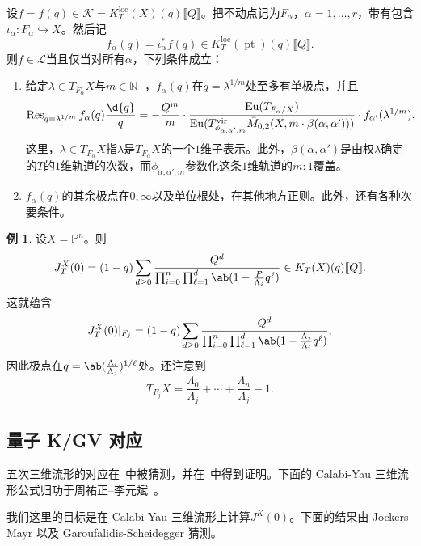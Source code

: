 \documentclass{amsart}
\theoremstyle{definition}
\newtheorem{exm}[thm]{例}
\theoremstyle{remark}
\theoremstyle{plain}
\theoremstyle{definition}
\theoremstyle{remark}
\newcommand{\N}{\mathbb{N}}
\renewcommand{\P}{\mathbb{P}}
\newcommand{\mc}[1]{\mathcal{#1}}
\newcommand{\mr}[1]{\mathrm{#1}}
\newcommand{\on}[1]{\operatorname{#1}}
\newcommand{\1}{\mathbf{1}}
\newcommand{\2}{\mathbf{2}}
\newcommand{\3}{\mathbf{3}}
\newcommand{\vir}{\mr{vir}}
\newcommand{\ps}[1]{\llbracket #1 \rrbracket}
\newcommand{\loc}{\mr{loc}}
\begin{document}
设\(f = f(q) \in \mc{K} = K_T^{\loc}(X)(q)\ps{Q}\)。把不动点记为\(F_{\alpha}\)，\(\alpha = 1, \ldots, r\)，带有包含\(\iota_{\alpha} \colon F_{\alpha} \hookrightarrow X\)。然后记
\[ f_{\alpha}(q) = \iota_{\alpha}^* f(q) \in K_T^{\loc}(\on{pt})(q)\ps{Q}. \]
则\(f \in \mc{L}\)当且仅当对所有\(\alpha\)，下列条件成立：
\begin{enumerate}
    \item 给定\(\lambda \in T_{F_{\alpha}} X\)与\(m \in \N_+\)，\(f_{\alpha}(q)\)在\(q = \lambda^{1/m}\)处至多有单极点，并且
        \[ \on{Res}_{q = \lambda^{1/m}} f_{\alpha}(q) \frac{\d{q}}{q} = -\frac{Q^m}{m} \cdot \frac{\on{Eu}(T_{F_{\alpha}/X})}{\on{Eu}(T^{\vir}_{\phi_{\alpha,\alpha',m}}\bar{M}_{0,2}(X, m \cdot \beta(\alpha, \alpha')))} \cdot f_{\alpha'}(\lambda^{1/m}). \]
        这里，\(\lambda \in T_{F_{\alpha}}X\)指\(\lambda\)是\(T_{F_{\alpha}} X\)的一个\(1\)维子表示。此外，\(\beta(\alpha,\alpha')\)是由权\(\lambda\)确定的\(T\)的\(1\)维轨道的次数，而\(\phi_{\alpha, \alpha', m}\)参数化这条\(1\)维轨道的\(m:1\)覆盖。
    \item \(f_{\alpha}(q)\)的其余极点在\(0, \infty\)以及单位根处，在其他地方正则。此外，还有各种次要条件。
\end{enumerate}

\begin{exm}
    设\(X = \P^n\)。则
    \[ J_T^X(0) = (1-q) \sum_{d \geq 0} \frac{Q^d}{\prod_{i=0}^n \prod_{\ell = 1}^d \ab(1 - \frac{P}{\Lambda_i} q^{\ell})} \in K_T(X)(q) \ps{Q}. \]
    这就蕴含
    \[ J_T^X(0) |_{F_j} = (1-q) \sum_{d \geq 0} \frac{Q^d}{\prod_{i=0}^n \prod_{\ell = 1}^d \ab(1 - \frac{\Lambda_j}{\Lambda_i}q^{\ell})}, \]
    因此极点在\(q = \ab(\frac{\Lambda_i}{\Lambda_j})^{1/\ell}\)处。还注意到
    \[ T_{F_j} X = \frac{\Lambda_0}{\Lambda_j} + \cdots + \frac{\Lambda_n}{\Lambda_j} - 1. \]
\end{exm}

\subsection{量子 K/GV 对应}%
\label{sub:Quantum K/GV correspondence}

五次三维流形的对应在~\cite{GaroufalidisScheidegger2022}中被猜测，并在~\cite{ChouLeeQuintic}中得到证明。下面的 Calabi-Yau 三维流形公式归功于周祐正–李元斌~\cite{ChouLee2025}。

我们这里的目标是在 Calabi-Yau 三维流形上计算\(J^K(0)\)。下面的结果由 Jockers-Mayr 以及 Garoufalidis-Scheidegger 猜测。
\end{document}
